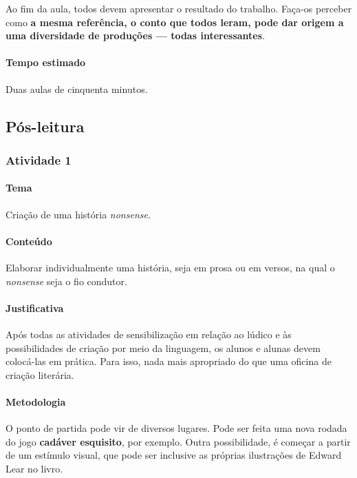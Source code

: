 \documentclass[11pt]{extarticle}
\begin{document}

Ao fim da aula, todos devem apresentar o resultado do trabalho.
Faça-os perceber como \textbf{a mesma referência, o conto que todos leram,
pode dar origem a uma diversidade de produções --- todas interessantes}.


\paragraph{Tempo estimado} Duas aulas de cinquenta minutos.


\subsection{Pós-leitura}

\subsubsection{Atividade 1}

\paragraph{Tema} Criação de uma história \emph{nonsense}.

\paragraph{Conteúdo} Elaborar individualmente uma história, seja em prosa ou
em versos, na qual o \emph{nonsense} seja o fio condutor. 

\paragraph{Justificativa} Após todas as atividades de sensibilização 
em relação ao lúdico e às possibilidades de criação por meio da linguagem, 
os alunos e alunas devem colocá-las em prática.
Para isso, nada mais apropriado do que uma oficina de criação literária. 


\paragraph{Metodologia} O ponto de partida pode vir de diversos lugares.
Pode ser feita uma nova rodada do jogo \textbf{cadáver esquisito},
por exemplo. Outra possibilidade, é começar a partir de um estímulo
visual, que pode ser inclusive as próprias ilustrações de Edward Lear 
no livro. 
\end{document}

